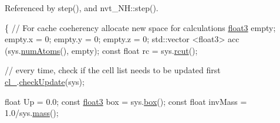 Referenced by step(), and nvt\-\_\-\-N\-H\-::step().


\begin{DoxyCode}
                                                 \{
    \textcolor{comment}{// For cache coeherency allocate new space for calculations}
    \hyperlink{structfloat3}{float3} empty;
    empty.x = 0; empty.y = 0; empty.z = 0;
    std::vector <float3> acc (sys.\hyperlink{classsystem_definition_ae8d3c2df2d56241cee03fcc4e2026ae0}{numAtoms}(), empty);
    \textcolor{keyword}{const} \textcolor{keywordtype}{float} rc = sys.\hyperlink{classsystem_definition_acacd88aac7d451bdcf9779ae8c5a95c7}{rcut}();

    \textcolor{comment}{// every time, check if the cell list needs to be updated first}
    \hyperlink{classintegrator_ad1f7813c9cf3c31898aa7d78fc22232a}{cl\_}.\hyperlink{classcell_list__cpu_a70568e6a2012eb8592f2798b3260c550}{checkUpdate}(sys);

    \textcolor{keywordtype}{float} Up = 0.0;
    \textcolor{keyword}{const} \hyperlink{structfloat3}{float3} box = sys.\hyperlink{classsystem_definition_a85b80dee3609ddb68e370cee3fa959ea}{box}();
    \textcolor{keyword}{const} \textcolor{keywordtype}{float} invMass = 1.0/sys.\hyperlink{classsystem_definition_acb6dd3df121e3e5bc0eb41c32bd937bd}{mass}();
    

\end{DoxyCode}
